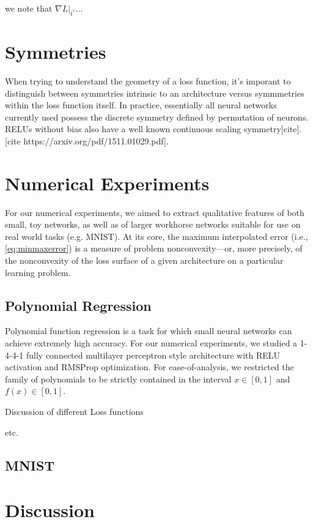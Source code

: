 \documentclass[twocolumn,superscriptaddress,aps,prb,floatfix]{revtex4-1}
\begin{document}
  
  we note that $\nabla L \bigg|_{t^*}...$
 
\section{Symmetries}
\label{sec:Symm}

When trying to understand the geometry of a loss function, it's imporant to distinguish between symmetries intrinsic to an architecture versus symmmetries within the loss function itself.  In practice, essentially all neural networks currently used possess the discrete symmetry defined by permutation of neurons.  RELUs without bias also have a well known continuous scaling symmetry[cite].  [cite https://arxiv.org/pdf/1511.01029.pdf].  


 
 
\section{Numerical Experiments}
\label{sec:NumExp}

For our numerical experiments, we aimed to extract qualitative features of both small, toy networks, as well as of larger workhorse networks suitable for use on real world tasks (e.g. MNIST).  At its core, the maximum interpolated error (i.e., \eqref{eq:minmaxerror}) is a measure of problem nonconvexity---or, more precisely, of the nonconvexity of the loss surface of a given architecture on a particular learning problem.


\subsection{Polynomial Regression}
\label{sec:PolyFuncs}

 Polynomial function regression is a task for which small neural networks can achieve extremely high accuracy.  For our numerical experiments, we studied a 1-4-4-1 fully connected multilayer perceptron style architecture with RELU activation and RMSProp optimization.  For ease-of-analysis, we restricted the family of polynomials to be strictly contained in the interval $x\in[0,1]$ and $f(x)\in[0,1]$.
 
 Discussion of different Loss functions
 
 etc.


\subsection{MNIST}
\label{sec:MNIST}


\section{Discussion}
\label{sec:Discussion}

 
 


\end{document}
